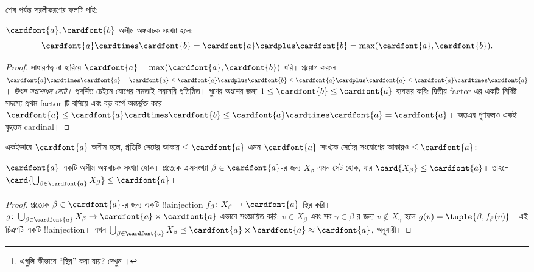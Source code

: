 \documentclass[../../../include/open-logic-section]{subfiles}
\begin{document}
শেষ পর্যন্ত সরলীকরণের ফলটি পাই:

\begin{thm}
$\cardfont{a},\cardfont{b}$ অসীম অঙ্কবাচক সংখ্যা হলে:
\[
	\cardfont{a}
\cardtimes \cardfont{b} = \cardfont{a} \cardplus \cardfont{b} =
\text{max}(\cardfont{a}, \cardfont{b}).
\]
\end{thm}

\begin{proof}
সাধারণত্ব না হারিয়ে
$\cardfont{a}=\max(\cardfont{a},\cardfont{b})$
ধরি।  প্রয়োগ করলে
$\cardfont{a}\cardtimes\cardfont{a}=\cardfont{a}\leq
\cardfont{a}\cardplus\cardfont{b}\leq
\cardfont{a}\cardplus\cardfont{a}\leq
\cardfont{a}\cardtimes\cardfont{a}$।
\emph{উৎস-সংশোধন-নোট।} প্রদর্শিত চেইনে যোগের
সমতাই সরাসরি প্রতিষ্ঠিত। গুণের অংশের জন্য
$1\leq\cardfont{b}\leq\cardfont{a}$ ব্যবহার করি:
দ্বিতীয় factor-এর একটি নির্দিষ্ট সদস্যে প্রথম factor-টি
বসিয়ে এবং বড় বর্গে অন্তর্ভুক্ত করে
$\cardfont{a}\leq\cardfont{a}\cardtimes\cardfont{b}
\leq\cardfont{a}\cardtimes\cardfont{a}=\cardfont{a}$।
অতএব গুণফলও একই বৃহত্তম cardinal।
\end{proof}\noindent একইভাবে $\cardfont{a}$ অসীম হলে,
প্রতিটি সেটের আকার $\leq\cardfont{a}$ এমন
$\cardfont{a}$-সংখ্যক সেটের সংযোগের আকারও
$\leq\cardfont{a}$:

\begin{prop}
$\cardfont{a}$ একটি অসীম অঙ্কবাচক সংখ্যা হোক।
প্রত্যেক ক্রমসংখ্যা $\beta\in\cardfont{a}$-র জন্য
$X_\beta$ এমন সেট হোক, যার
$\card{X_\beta}\leq\cardfont{a}$। তাহলে
$\card{\bigcup_{\beta\in\cardfont{a}}X_\beta}
\leq\cardfont{a}$।
\end{prop}

\begin{proof}
প্রত্যেক $\beta\in\cardfont{a}$-র জন্য একটি
!!a{injection} $f_\beta\colon X_\beta\to\cardfont{a}$
স্থির করি।\footnote{এগুলি কীভাবে ``স্থির'' করা যায়?
দেখুন ।}
$g\colon\bigcup_{\beta\in\cardfont{a}}X_\beta\to
\cardfont{a}\times\cardfont{a}$ এভাবে সংজ্ঞায়িত
করি: $v\in X_\beta$ এবং সব
$\gamma\in\beta$-র জন্য $v\notin X_\gamma$
হলে $g(v)=\tuple{\beta,f_\beta(v)}$। এই চিত্রণটি
একটি !!a{injection}। এখন
$\bigcup_{\beta\in\cardfont{a}}X_\beta
\preceq\cardfont{a}\times\cardfont{a}
\approx\cardfont{a}$,
 অনুযায়ী।
\end{proof}
\end{document}
